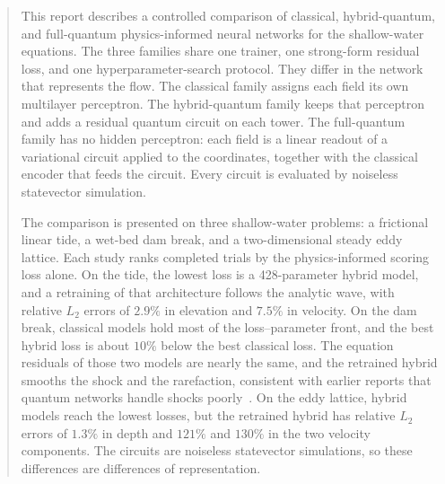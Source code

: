 \documentclass{erdc}
\begin{document}
\begin{abstract}
This report describes a controlled comparison of classical,
hybrid-quantum, and full-quantum physics-informed neural networks for
the shallow-water equations. The three families share one trainer, one
strong-form residual loss, and one hyperparameter-search protocol. They
differ in the network that represents the flow. The classical family
assigns each field its own multilayer perceptron. The hybrid-quantum
family keeps that perceptron and adds a residual quantum circuit on
each tower. The full-quantum family has no hidden perceptron: each
field is a linear readout of a variational circuit applied to the
coordinates, together with the classical encoder that feeds the
circuit. Every circuit is evaluated by noiseless statevector
simulation.

The comparison is presented on three shallow-water problems: a
frictional linear tide, a wet-bed dam break, and a two-dimensional
steady eddy lattice. Each study ranks completed trials by the
physics-informed scoring loss alone. On the tide, the lowest loss is a
428-parameter hybrid model, and a retraining of that architecture
follows the analytic wave, with relative \(L_2\) errors of \(2.9\%\) in
elevation and \(7.5\%\) in velocity. On the dam break, classical models
hold most of the loss--parameter front, and the best hybrid loss is
about \(10\%\) below the best classical loss. The equation residuals of
those two models are nearly the same, and the retrained hybrid smooths
the shock and the rarefaction, consistent with earlier reports that
quantum networks handle shocks poorly~\cite{leong2025highspeed}. On the eddy lattice, hybrid models reach
the lowest losses, but the retrained hybrid has relative \(L_2\) errors
of \(1.3\%\) in depth and \(121\%\) and \(130\%\) in the two velocity
components. The circuits are noiseless statevector
simulations, so these differences are differences of representation.
\end{abstract}





\end{document}

